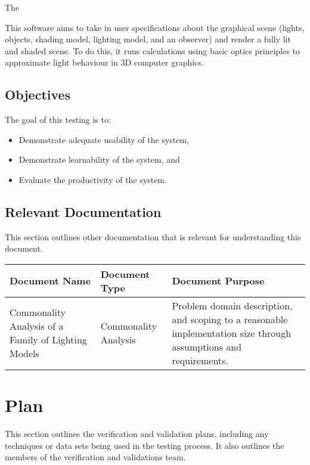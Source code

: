 \documentclass[12pt, titlepage]{article}
\begin{document}
The \progname 

This software aims to take in user specifications about the graphical scene 
(lights, objects, shading model, lighting model, and an observer) and render a 
fully lit and shaded scene. To do this, it runs calculations using basic optics 
principles to approximate light behaviour in 3D computer graphics.

\subsection{Objectives}
The goal of this testing is to:

\begin{itemize}
	\item Demonstrate adequate usability of the system,
	\item Demonstrate learnability of the system, and
	\item Evaluate the productivity of the system.
\end{itemize}
%

\pagebreak
\subsection{Relevant Documentation}
This section outlines other documentation that is relevant for understanding 
this document.
\begin{table}[h]
	\begin{tabular}{|p{3.5cm}|p{3cm}|p{8cm}|}
		\hline
	\textbf{Document Name} & \textbf{Document Type} & \textbf{Document Purpose} 
	 \\
		\hline
		Commonality Analysis of a Family of Lighting Models& Commonality 
		Analysis & Problem domain description, and scoping to a reasonable 
		implementation size through assumptions and requirements. \\ 
		\hline
	\end{tabular}
\end{table}

\section{Plan}
This section outlines the verification and validation plans, including any 
techniques or data sets being used in the testing process. It also outlines the 
members of the verification and validations team.
	
\end{document}
